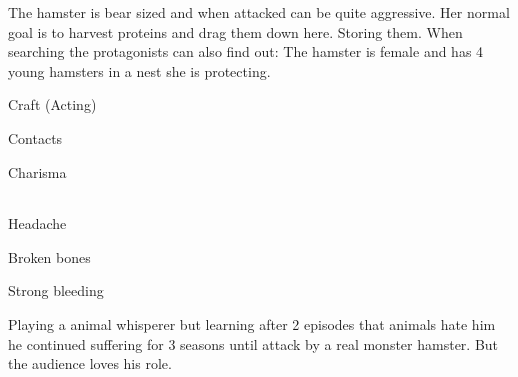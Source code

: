 \begin{npcBox}[title=Hamster]
    \begin{consequences}
    \item {}
    \item {}
    \item {}
    \end{consequences}
    
    \begin{npcDescription}
    The hamster is bear sized and when attacked can be quite aggressive. Her normal goal is to harvest proteins and drag them down here. Storing them. When searching the protagonists can also find out: The hamster is female and has 4 young hamsters in a nest she is protecting.
    \end{npcDescription}
    
\end{npcBox}


\begin{npcBox}[title=Theophil Tierlieb]

    \begin{aspects}
    \item {}
    \item {}
    \item {}
    \end{aspects}
    
    \begin{skills}
    \item {} Craft (Acting)
    \item {} Contacts
    \item {} Charisma
    \end{skills}
        
    \begin{stressSection}
    \end{stressSection}
    \begin{tabularx}{\textwidth}{ XX }
    \end{tabularx}
    
    \begin{consequences}
    \item {} Headache
    \item {} Broken bones
    \item {} Strong bleeding
    \end{consequences}
    
    \begin{npcDescription}
    Playing a animal whisperer but learning after 2 episodes that animals hate him he continued suffering for 3 seasons until attack by a real monster hamster. But the audience loves his role.
    \end{npcDescription}
    
\end{npcBox}


